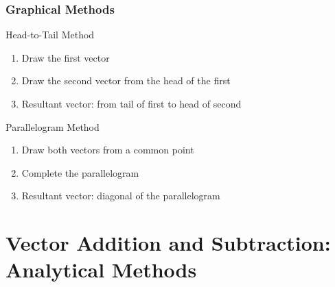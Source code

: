 \documentclass{beamer}
\begin{document}
\begin{frame}
\frametitle{Graphical Methods}
\begin{block}{Head-to-Tail Method}
\begin{enumerate}
\item Draw the first vector
\item Draw the second vector from the head of the first
\item Resultant vector: from tail of first to head of second
\end{enumerate}
\end{block}

\begin{block}{Parallelogram Method}
\begin{enumerate}
\item Draw both vectors from a common point
\item Complete the parallelogram
\item Resultant vector: diagonal of the parallelogram
\end{enumerate}
\end{block}
\end{frame}

\section{Vector Addition and Subtraction: Analytical Methods}
\end{document}
